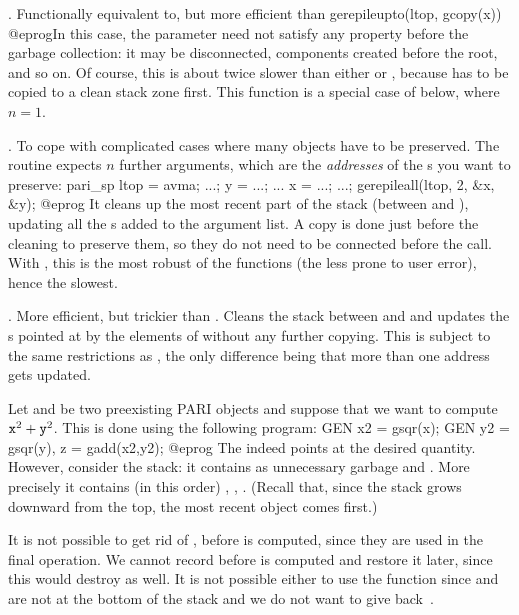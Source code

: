 . Functionally equivalent to,
but more efficient than
\bprog
  gerepileupto(ltop, gcopy(x))
@eprog\noindent In this case, the  parameter  need not
satisfy any property before the garbage collection: it may be disconnected,
components created before the root, and so on. Of course, this is about
twice slower than either  or , because
 has to be copied to a clean stack zone first. This function is a
special case of  below, where $n=1$.

.
To cope with complicated cases where many objects have to be preserved. The
routine expects $n$ further arguments, which are the \emph{addresses} of
the s you want to preserve:
\bprog
  pari_sp ltop = avma;
  ...; y = ...; ... x = ...; ...;
  gerepileall(ltop, 2, &x, &y);
@eprog\noindent
It cleans up the most recent part of the
stack (between  and ), updating all the s added
to the argument list. A copy is done just before the cleaning to preserve
them, so they do not need to be connected before the call. With
, this is the most robust of the  functions
(the less prone to user error), hence the slowest.

.
More efficient, but trickier than . Cleans the stack between
 and  and updates the s pointed at by the
elements of  without any further copying. This is subject to the
same restrictions as , the only difference being that more than
one address gets updated.



Let  and  be two preexisting PARI objects and suppose that we
want to compute ${\tt x}^2 + {\tt y}^2$. This is done using the following
program:
\bprog
  GEN x2 = gsqr(x);
  GEN y2 = gsqr(y), z = gadd(x2,y2);
@eprog\noindent
The   indeed points at the desired quantity. However,
consider the stack: it contains as unnecessary garbage  and .
More precisely it contains (in this order) , , .
(Recall that, since the stack grows downward from the top, the most recent
object comes first.)

It is not possible to get rid of ,  before  is
computed, since they are used in the final operation. We cannot record
 before  is computed and restore it later, since this would
destroy  as well. It is not possible either to use the function
 since  and  are not at the bottom of the stack and
we do not want to give back~.

